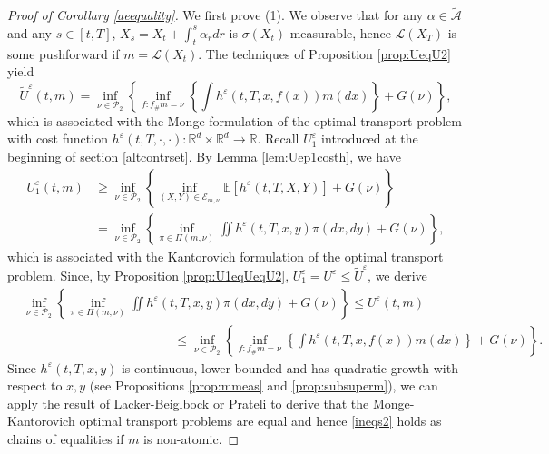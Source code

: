 \documentclass[reqno,11pt]{amsart}
\numberwithin{equation}{section}
\newcommand{\be}{\begin{equation}}
\newcommand{\ee}{\end{equation}}
\newcommand{\R}{\mathbb{R}} %
\newcommand{\e}{\varepsilon}
\newcommand{\ep}{\varepsilon}
\begin{document}
\begin{proof}[Proof of Corollary \ref{aeequality}]
   We first prove (1). We observe that for any $\alpha\in \widetilde{\mathcal{A}}$ and any $s\in [t,T]$, $X_s=X_t+\int_t^s \alpha_r dr$ is $\sigma(X_t)$-measurable, hence $\mathcal{L}(X_T)$ is some pushforward if $m=\mathcal{L}(X_t)$. The techniques of Proposition \ref{prop:UeqU2} yield
    \[
\widetilde{U}^\e(t,m)=\inf_{\nu\in \mathcal{P}_2}\left\{ \inf_{f: f_\#m=\nu}\left\{\int h^\e(t,T,x,f(x))m(dx) \right\}  +G(\nu)  \right\},
\]
which is associated with the Monge formulation of the optimal transport problem with cost function $h^\e(t,T,\cdot,\cdot)\colon \R^d\times\R^d\to \R$. Recall $U_1^\e$ introduced at the beginning of section \ref{altcontrset}. By Lemma \ref{lem:Uep1costh}, we have
\begin{align}
U_1^\ep(t,m)
&\ge \inf_{\nu\in \mathcal{P}_2}\left\{ \inf_{(X, Y) \in \mathcal{E}_{m,\nu}}\mathbb{E}[h^\e(t,T,X,Y)]+ G(\nu) \right\}\nonumber\\
&= \inf_{\nu\in \mathcal{P}_2}\left\{ \inf_{\pi\in \Pi(m,\nu)}\iint h^\e(t,T,x,y)\pi(dx,dy)+ G(\nu) \right\},\nonumber
\end{align}
which is associated with the Kantorovich formulation of the optimal transport problem. Since, by Proposition \ref{prop:U1eqUeqU2}, $U^\ep_1 =U^\e \leq \widetilde{U}^\ep$, we derive
\be\label{ineqs2}
\begin{split}
&\inf_{\nu\in \mathcal{P}_2}\left\{ \inf_{\pi\in \Pi(m,\nu)}\iint h^\e(t,T,x,y)\pi(dx,dy)+ G(\nu) \right\}\le U^\e(t,m)\\
&\hspace{5cm}\le \inf_{\nu\in \mathcal{P}_2}\left\{ \inf_{f: f_\#m=\nu}\left\{\int h^\e(t,T,x,f(x))m(dx) \right\}  +G(\nu)  \right\}.
\end{split}
\ee
Since $h^\e(t,T,x,y)$ is continuous, lower bounded and has quadratic growth with respect to $x,y$ (see Propositions \ref{prop:mmeas} and \ref{prop:subsuperm}), we can apply the result of Lacker-Beiglbock \cite[Proposition 2.11]{beiglbock2018denseness} or Prateli \cite[Theorem B]{pratelli2007equality} to derive that the Monge-Kantorovich optimal transport problems are equal and hence \eqref{ineqs2} holds as chains of equalities if $m$ is non-atomic.


\end{proof}
\end{document}
